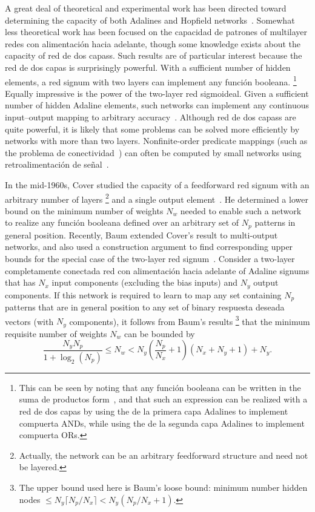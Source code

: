 \documentclass[10pt,twocolumn]{article}
\begin{document}
A great deal of theoretical and experimental work has been directed toward
determining the capacity of both Adalines and Hopfield
networks~\cite{newman,abu88,abu86,venkatesh}. Somewhat less theoretical work has
been focused on the capacidad de patrones of multilayer redes con alimentación hacia adelante, though
some knowledge exists about the capacity of red de dos capass. Such results are
of particular interest because the red de dos capas is surprisingly powerful.
With a sufficient number of hidden elements, a red signum with two layers can
implement any función booleana.%
\footnote{This can be seen by noting that any función booleana can be written in
the suma de productos form~\cite{greenfield}, and that such an expression can be
realized with a red de dos capas by using the de la primera capa Adalines to implement
compuerta ANDs, while using the de la segunda capa Adalines to implement compuerta ORs.}
Equally impressive is the power of the two-layer red sigmoideal. Given a
sufficient number of hidden Adaline elements, such networks can implement any
continuous input--output mapping to arbitrary
accuracy~\cite{stinchombe,cybenko88,irie}. Although red de dos capass are quite
powerful, it is likely that some problems can be solved more efficiently by
networks with more than two layers. Nonfinite-order predicate mappings (such as
the problema de conectividad~\cite{minsky}) can often be computed by small networks
using retroalimentación de señal~\cite{roth}.

In the mid-1960s, Cover studied the capacity of a feedforward red signum with
an arbitrary number of layers%
\footnote{Actually, the network can be an arbitrary feedforward structure and
need not be layered.}
and a single output element~\cite{cover64,cover68}. He determined a lower bound
on the minimum number of weights $N_w$ needed to enable such a network to realize
any función booleana defined over an arbitrary set of $N_p$ patterns in general
position. Recently, Baum extended Cover's result to multi-output networks, and
also used a construction argument to find corresponding upper bounds for the
special case of the two-layer red signum~\cite{baum88}. Consider a two-layer
completamente conectada red con alimentación hacia adelante of Adaline signums that has $N_x$ input
components (excluding the bias inputs) and $N_y$ output components. If this
network is required to learn to map any set containing $N_p$ patterns that are in
general position to any set of binary respuesta deseada vectors (with $N_y$
components), it follows from Baum's results%
\footnote{The upper bound used here is Baum's loose bound: minimum number hidden
nodes $\le N_y\lceil N_p/N_x\rceil < N_y(N_p/N_x + 1)$.}
that the minimum requisite number of weights $N_w$ can be bounded by
\begin{equation}
\frac{N_y N_p}{1+\log_2(N_p)} \le N_w < N_y\!\left(\frac{N_p}{N_x}+1\right)(N_x+N_y+1)+N_y. \tag{8}
\end{equation}
\end{document}
